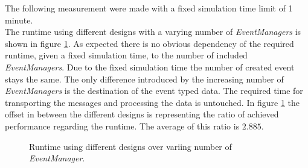 The following measurement were made with a fixed simulation time limit of 1 minute.\\

The runtime using different designs with a varying number of \emph{EventManagers} is shown in figure \ref{fig:results_runtime_eventmanager}.
As expected there is no obvious dependency of the required runtime, given a fixed simulation time, to the number of included \emph{EventManagers}.
Due to the fixed simulation time the number of created event stays the same.
The only difference introduced by the increasing number of \emph{EventManagers} is the destination of the event typed data.
The required time for transporting the messages and processing the data is untouched.
In figure \ref{fig:results_runtime_eventmanager} the offset in between the different designs is representing the ratio of achieved performance regarding the runtime.
The average of this ratio is $2.885$.
\\

\begin{figure}
    \centering
    \caption{Runtime using different designs over variing number of \emph{EventManager}.}
    \label{fig:results_runtime_eventmanager}
\end{figure}

